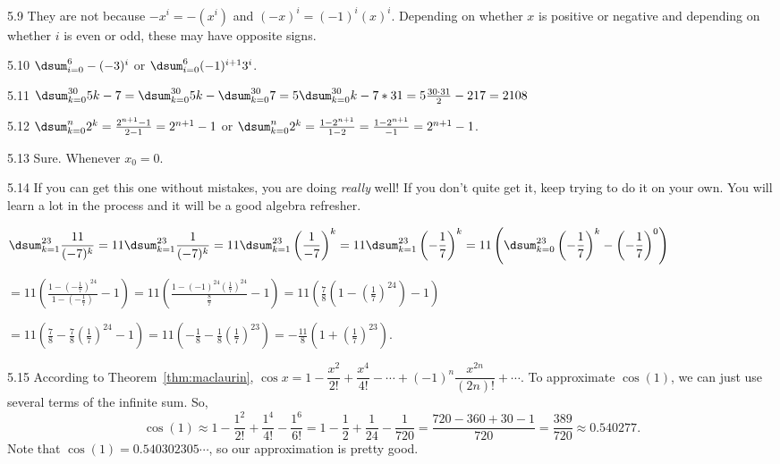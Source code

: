 \begin{RequAnswer}{5.9}
They are not because $-x^i=-(x^i)$ and $(-x)^i=(-1)^i(x)^i$. Depending on whether $x$ is positive or negative
and depending on whether $i$ is even or odd, these may have opposite signs.
\end{RequAnswer}
\begin{RequAnswer}{5.10}
$\dsum_{i=0}^6 -(-3)^i$ or $\dsum_{i=0}^6 (-1)^{i+1}3^i$.
\end{RequAnswer}
\begin{RequAnswer}{5.11}
$\dsum_{k=0}^{30} 5k-7 = \dsum_{k=0}^{30} 5k - \dsum_{k=0}^{30} 7=5\dsum_{k=0}^{30} k - 7*31
=5\frac{30\cdot 31}{2} - 217 = 2108$
\end{RequAnswer}
\begin{RequAnswer}{5.12}
$\dsum_{k=0}^{n} 2^k = \frac{2^{n+1} -1}{2-1} = 2^{n+1}-1$
or
$\dsum_{k=0}^{n} 2^k = \frac{1 - 2^{n+1}}{1 - 2} = \frac{1-2^{n+1}}{-1} = 2^{n+1}-1$.
\end{RequAnswer}
\begin{RequAnswer}{5.13}
Sure. Whenever $x_0=0$.
\end{RequAnswer}
\begin{RequAnswer}{5.14}
If you can get this one without mistakes, you are doing {\em really} well! If you don't quite get it, keep
trying to do it on your own. You will learn a lot in the process and it will be a good algebra refresher.

$\displaystyle
\dsum_{k=1}^{23} \frac{11}{(-7)^k}
= 11\dsum_{k=1}^{23} \frac{1}{(-7)^k}
= 11\dsum_{k=1}^{23} \left(\frac{1}{-7}\right)^k
= 11\dsum_{k=1}^{23} \left(-\frac{1}{7}\right)^k
= 11\left(\dsum_{k=0}^{23} \left(-\frac{1}{7}\right)^k - \left(-\frac{1}{7}\right)^0\right)
$

$\displaystyle
= 11\left( \frac{1-\left(-\frac{1}{7}\right)^{24}}{1-\left(-\frac{1}{7}\right)} - 1\right)
= 11\left( \frac{1-\left(-1\right)^{24}\left(\frac{1}{7}\right)^{24}}{\frac{8}{7}} - 1\right)
= 11\left( \frac{7}{8}\left(1-\left(\frac{1}{7}\right)^{24}\right) - 1\right)
$

$\displaystyle
= 11\left(\frac{7}{8} -\frac{7}{8}\left(\frac{1}{7}\right)^{24} - 1\right)
= 11\left(-\frac{1}{8} -\frac{1}{8}\left(\frac{1}{7}\right)^{23}\right)
= -\frac{11}{8}\left(1+\left(\frac{1}{7}\right)^{23}\right)
$.
\end{RequAnswer}
\begin{RequAnswer}{5.15}
According to Theorem~\ref{thm:maclaurin},
$\cos x = 1 - \dfrac{x^2}{2!} + \dfrac{x^4}{4!} - \cdots +(-1)^n\dfrac{x^{2n}}{(2n)!} +  \cdots$.
To approximate $\cos(1)$, we can just use several terms of the infinite sum.
So,
$$\cos(1) \approx 1 - \dfrac{1^2}{2!} + \dfrac{1^4}{4!} -  \dfrac{1^6}{6!}
=1-\dfrac{1}{2}+\dfrac{1}{24}-\dfrac{1}{720}
=\dfrac{720-360+30-1}{720} = \dfrac{389}{720}\approx 0.540277.$$
Note that $\cos(1)=0.540302305\cdots $, so our approximation is pretty good.
\end{RequAnswer}

